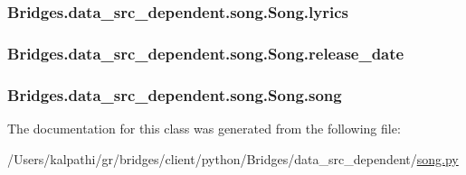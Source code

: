 \subsubsection[{lyrics}]{\setlength{\rightskip}{0pt plus 5cm}Bridges.\+data\+\_\+src\+\_\+dependent.\+song.\+Song.\+lyrics}\label{class_bridges_1_1data__src__dependent_1_1song_1_1_song_ae6ac66576fe91574af55fbe8267a684b}
\hypertarget{class_bridges_1_1data__src__dependent_1_1song_1_1_song_aea4d25050b12972980c8572543a59cfc}{}
\subsubsection[{release\+\_\+date}]{\setlength{\rightskip}{0pt plus 5cm}Bridges.\+data\+\_\+src\+\_\+dependent.\+song.\+Song.\+release\+\_\+date}\label{class_bridges_1_1data__src__dependent_1_1song_1_1_song_aea4d25050b12972980c8572543a59cfc}
\hypertarget{class_bridges_1_1data__src__dependent_1_1song_1_1_song_ac5a91e041afaa2dcc712ea4224d3fab7}{}
\subsubsection[{song}]{\setlength{\rightskip}{0pt plus 5cm}Bridges.\+data\+\_\+src\+\_\+dependent.\+song.\+Song.\+song}\label{class_bridges_1_1data__src__dependent_1_1song_1_1_song_ac5a91e041afaa2dcc712ea4224d3fab7}


The documentation for this class was generated from the following file\+:\begin{DoxyCompactItemize}
\item 
/\+Users/kalpathi/gr/bridges/client/python/\+Bridges/data\+\_\+src\+\_\+dependent/\hyperlink{song_8py}{song.\+py}\end{DoxyCompactItemize}
